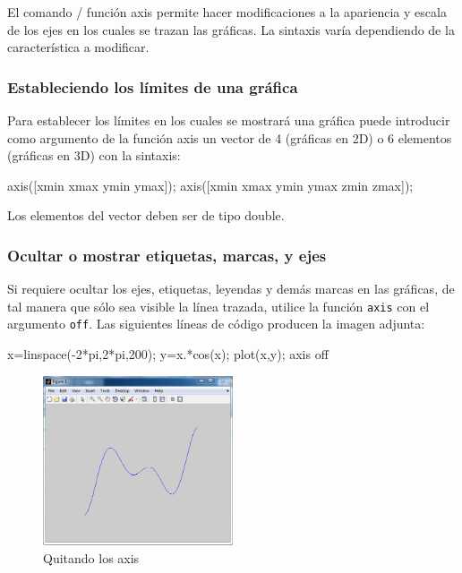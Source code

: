 El comando / función axis permite hacer modificaciones a la apariencia y
escala de los ejes en los cuales se trazan las gráficas. La sintaxis
varía dependiendo de la característica a modificar.

\subsubsection{Estableciendo los límites de una gráfica}

Para establecer los límites en los cuales se mostrará una gráfica puede
introducir como argumento de la función axis un vector de 4 (gráficas en
2D) o 6 elementos (gráficas en 3D) con la sintaxis:

\begin{matlab}
axis([xmin xmax ymin ymax]); %
axis([xmin xmax ymin ymax zmin zmax]); %
\end{matlab}

Los elementos del vector deben ser de tipo double.

\subsubsection{Ocultar o mostrar etiquetas, marcas, y ejes}

Si requiere ocultar los ejes, etiquetas, leyendas y demás marcas en las
gráficas, de tal manera que sólo sea visible la línea trazada, utilice
la función \texttt{axis} con el argumento \texttt{off}. Las siguientes
líneas de código producen la imagen adjunta:

\begin{matlab}
x=linspace(-2*pi,2*pi,200);
y=x.*cos(x);
plot(x,y);
axis off
\end{matlab}

\begin{figure}[htbp]
    \centering
    \includegraphics[width=0.5\textwidth]{images/ch4/img_4_5.png}
    \caption{Quitando los axis}
    \label{fig:img_4_5}
\end{figure}

